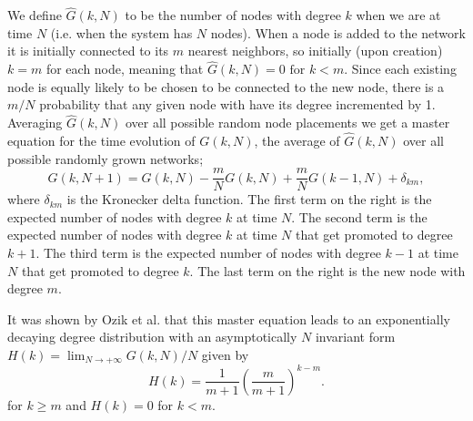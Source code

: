 \documentclass[aps,pre,reprint,superscriptaddress,amsmath,amssymb,nofootinbib]{revtex4-1}
\begin{document}
We define $\hat{G}(k,N)$ to be the number of nodes with degree $k$ when we are at time $N$ (i.e. when the system has $N$ nodes).
When a node is added to the network it is initially connected to its $m$ nearest neighbors, so initially (upon creation) $k = m$ for each node, meaning that $\hat{G}(k,N) = 0 \text{ for } k < m$.
Since each existing node is equally likely to be chosen to be connected to the new node, there is a $m/N$ probability that any given node with have its degree incremented by 1.
Averaging $\hat{G}(k,N)$ over all possible random node placements we get a master equation for the time evolution of $G(k,N)$, the average of $\hat{G}(k,N)$ over all possible randomly grown networks;
\begin{equation}
G(k,N+1) = G(k,N) - \frac{m}{N}G(k,N) + \frac{m}{N}G(k-1,N) + \delta_{km},
\end{equation}
\noindent where $\delta_{km}$ is the Kronecker delta function.
The first term on the right is the expected number of nodes with degree $k$ at time $N$.
The second term is the expected number of nodes with degree $k$ at time $N$ that get promoted to degree $k+1$.
The third term is the expected number of nodes with degree $k-1$ at time $N$ that get promoted to degree $k$.
The last term on the right is the new node with degree $m$.

It was shown by Ozik et al. \cite{ozik2004} that this master equation leads to an exponentially decaying degree distribution with an asymptotically $N$ invariant form $H(k) = \lim_{N \to +\infty} G(k,N)/N$ given by
\begin{equation}\label{degeq}
H(k) = \frac{1}{m+1}\left(\frac{m}{m+1}\right)^{k-m}.
\end{equation}
\noindent for $k \geq m$ and $H(k) = 0$ for $k < m$.
\end{document}
